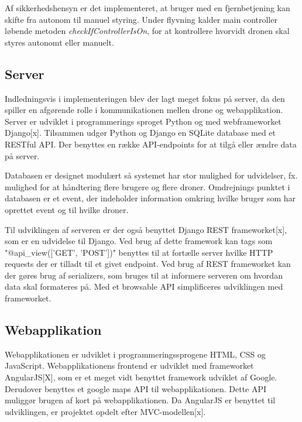 Af sikkerhedshensyn er det implementeret, at bruger med en fjernbetjening kan skifte fra autonom til manuel styring. Under flyvning kalder main controller løbende metoden \textit{checkIfControllerIsOn}, for at kontrollere hvorvidt dronen skal styres autonomt eller manuelt.  

\subsection{Server}
Indledningsvis i implementeringen blev der lagt meget fokus på server, da den spiller en afgørende rolle i kommunikationen mellen drone og webapplikation. 
Server er udviklet i programmerings sproget Python og med webframeworket Django[x].
Tilsammen udgør Python og Django en SQLite database med et RESTful API. Der benyttes en række API-endpoints for at tilgå eller ændre data på server.

Databasen er designet modulært så systemet har stor mulighed for udvidelser, fx. mulighed for at håndtering flere brugere og flere droner. Omdrejnings punktet i databasen er et event, der indeholder information omkring hvilke bruger som har oprettet event og til hvilke droner.

Til udviklingen af serveren er der også benyttet Django REST frameworket[x], som er en udvidelse til Django. Ved brug af dette framework kan tags som "@api\_view(['GET', 'POST'])" benyttes til at fortælle server hvilke HTTP requests der er tilladt til et givet endpoint. 
Ved brug af REST frameworket kan der gøres brug af serializers, som bruges til at informere  serveren om hvordan data skal formateres på. Med et browsable API simplificeres udviklingen med frameworket.

\newpage
\subsection{Webapplikation}
Webapplikationen  er udviklet i programmeringssprogene HTML, CSS og JavaScript. Webapplikationens frontend er udviklet med frameworket AngularJS[X], som er et meget vidt benyttet framework udviklet af Google. Derudover benyttes et google maps API til webapplikationen. Dette API muliggør brugen af kort på webapplikationen. Da AngularJS er benyttet til udviklingen, er projektet opdelt efter MVC-modellen[x]. 

